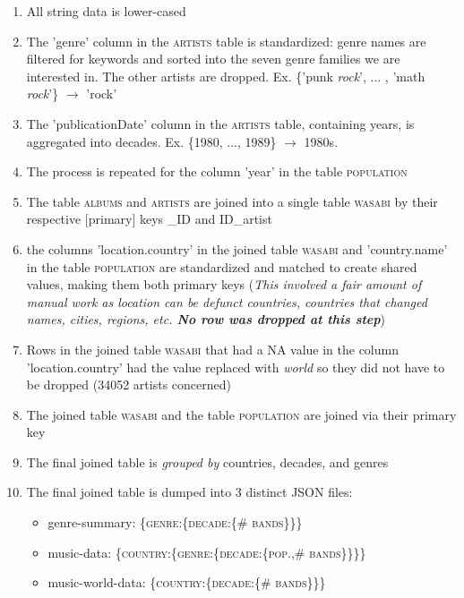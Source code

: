 \documentclass[twocolumn, letterpaper,13pt]{scrartcl}
\begin{document}
    \begin{enumerate}
        \item All string data is lower-cased
        \item The 'genre' column in the \textsc{artists} table is standardized: genre names are filtered for keywords and sorted into the seven genre families we are interested in. The other artists are dropped. Ex. \{'punk \textit{rock}', ... , 'math \textit{rock}'\} $\rightarrow$ 'rock'
        \item The 'publicationDate' column in the \textsc{artists} table, containing years, is aggregated into decades. Ex. \{1980, ..., 1989\} $\rightarrow$ 1980s.
        \item The process is repeated for the column 'year' in the table \textsc{population}
        \item The table \textsc{albums} and \textsc{artists} are joined into a single table \textsc{wasabi} by their respective [primary] keys \_ID and ID\_artist
        \item the columns 'location.country' in the joined table \textsc{wasabi} and 'country.name' in the table \textsc{population} are standardized and matched to create shared values, making them both primary keys (\textit{This involved a fair amount of manual work as location can be defunct countries, countries that changed names, cities, regions, etc. \textbf{No row was dropped at this step}})
        \item Rows in the joined table \textsc{wasabi} that had a NA value in the column 'location.country' had the value replaced with \textit{world} so they did not have to be dropped (34052 artists concerned)
        \item The joined table \textsc{wasabi} and the table \textsc{population} are joined via their primary key
        \item The final joined table is \textit{grouped by} countries, decades, and genres
        \item The final joined table is dumped into 3 distinct JSON files:
        \begin{itemize}
            \item genre-summary:\linebreak
            \scriptsize{\{\textsc{genre}:\{\textsc{decade}:\{\textsc{\# bands}\}\}\}}
            \item music-data:\linebreak
            \scriptsize{\{\textsc{country}:\{\textsc{genre}:\{\textsc{decade}:\{\textsc{pop.},\textsc{\# bands}\}\}\}\}}
            \item music-world-data:\linebreak
            \scriptsize{\{\textsc{country}:\{\textsc{decade}:\{\textsc{\# bands}\}\}\}}
        \end{itemize}
    \end{enumerate}
    
\end{document}
